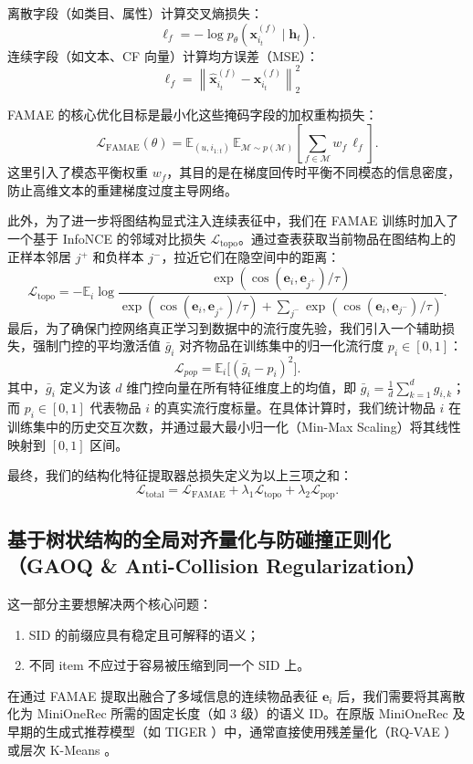 \documentclass[11pt]{article}
\begin{document}
离散字段（如类目、属性）计算交叉熵损失：
\[
\ell_f = -\log p_\theta \left( \mathbf{x}_{i_t}^{(f)} \mid \mathbf{h}_t \right).
\]
连续字段（如文本、CF 向量）计算均方误差（MSE）：
\[
\ell_f = \left\|\hat{\mathbf{x}}_{i_t}^{(f)} - \mathbf{x}_{i_t}^{(f)}\right\|_2^2 \quad
\]

FAMAE 的核心优化目标是最小化这些掩码字段的加权重构损失：
\[
\mathcal{L}_{\text{FAMAE}}(\theta) = \mathbb{E}_{(u, i_{1:t})} \, \mathbb{E}_{\mathcal{M} \sim p(\mathcal{M})} \left[ \sum_{f \in \mathcal{M}} w_f \, \ell_f \right].
\]
这里引入了模态平衡权重 $w_f$，其目的是在梯度回传时平衡不同模态的信息密度，防止高维文本的重建梯度过度主导网络。

此外，为了进一步将图结构显式注入连续表征中，我们在 FAMAE 训练时加入了一个基于 InfoNCE \cite{oord2018cpc} 的邻域对比损失 $\mathcal{L}_{\text{topo}}$。通过查表获取当前物品在图结构上的正样本邻居 $j^+$ 和负样本 $j^-$，拉近它们在隐空间中的距离：
\[
\mathcal{L}_{\text{topo}} = - \mathbb{E}_{i} \log \frac{\exp(\cos(\mathbf e_i,\mathbf e_{j^+})/\tau)}{\exp(\cos(\mathbf e_i,\mathbf e_{j^+})/\tau)+\sum_{j^-}\exp(\cos(\mathbf e_i,\mathbf e_{j^-})/\tau)}.
\]
最后，为了确保门控网络真正学习到数据中的流行度先验，我们引入一个辅助损失，强制门控的平均激活值 $\bar{g}_i$ 对齐物品在训练集中的归一化流行度 $p_i \in [0,1]$：
\[
\mathcal{L}_{pop} = \mathbb{E}_i\big[(\bar g_i - p_i)^2\big].
\]
其中，$\bar{g}_i$ 定义为该 $d$ 维门控向量在所有特征维度上的均值，即 $\bar{g}_i = \frac{1}{d}\sum_{k=1}^d g_{i,k}$；而 $p_i \in [0,1]$ 代表物品 $i$ 的真实流行度标量。在具体计算时，我们统计物品 $i$ 在训练集中的历史交互次数，并通过最大最小归一化（Min-Max Scaling）将其线性映射到 $[0,1]$ 区间。

最终，我们的结构化特征提取器总损失定义为以上三项之和：
\[
\mathcal{L}_{\text{total}} = \mathcal{L}_{\text{FAMAE}} + \lambda_1\mathcal{L}_{\text{topo}} + \lambda_2\mathcal{L}_{\text{pop}}.
\]



\subsection{基于树状结构的全局对齐量化与防碰撞正则化（GAOQ \& Anti-Collision Regularization）}
这一部分主要想解决两个核心问题：
\begin{enumerate}
  \item SID 的前缀应具有稳定且可解释的语义；
  \item 不同 item 不应过于容易被压缩到同一个 SID 上。
\end{enumerate}
在通过 FAMAE 提取出融合了多域信息的连续物品表征 $\mathbf{e}_i$ 后，我们需要将其离散化为 MiniOneRec 所需的固定长度（如 3 级）的语义 ID。在原版 MiniOneRec 及早期的生成式推荐模型（如 TIGER \cite{rajput2023tiger}）中，通常直接使用残差量化（RQ-VAE \cite{lee2022rqvae}）或层次 K-Means 。
\end{document}
